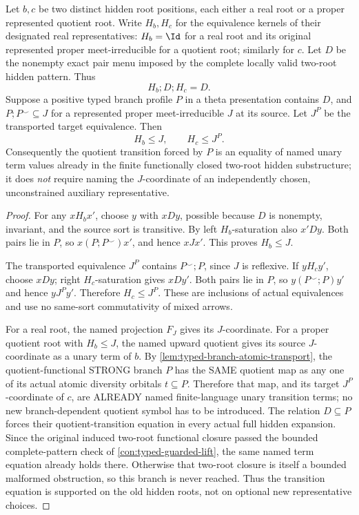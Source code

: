 \begin{lemma}
\label{lem:typed-branch-root-visibility}
Let \(b,c\) be two distinct hidden root positions,
each either a real root or a proper represented quotient
root. Write \(H_b,H_c\) for the equivalence kernels
of their designated real representatives:
\(H_b=\Id\) for a real root and its original
represented proper meet-irreducible for a quotient
root; similarly for \(c\). Let \(D\) be the
nonempty exact pair menu imposed by the
complete locally valid two-root hidden pattern.
Thus
\[
              H_b;D;H_c=D .
\tag{TV1}\label{eq:typed-anchored-bisaturation}
\]
Suppose a positive typed branch profile \(P\)
in a theta presentation contains \(D\), and
\(P;P^\smile\subseteq J\) for a represented
proper meet-irreducible \(J\) at its source.
Let \(J^P\) be the transported target equivalence.
Then
\[
                  H_b\le J,\qquad
                  H_c\le J^P .
\tag{TV2}\label{eq:typed-branch-visible-kernels}
\]
Consequently the quotient transition forced by
\(P\) is an equality of named unary term values
already in the finite functionally closed
two-root hidden substructure; it does
\emph{not} require naming the \(J\)-coordinate
of an independently chosen, unconstrained
auxiliary representative.
\end{lemma}
\begin{proof}
For any \(xH_bx'\), choose \(y\) with
\(xDy\), possible because \(D\) is nonempty,
invariant, and the source sort is transitive.
By left \(H_b\)-saturation also \(x'Dy\).
Both pairs lie in \(P\), so
\(x(P;P^\smile)x'\), and hence \(xJx'\).
This proves \(H_b\le J\).

The transported equivalence \(J^P\)
contains \(P^\smile;P\), since \(J\)
is reflexive. If \(yH_cy'\), choose
\(xDy\); right \(H_c\)-saturation
gives \(xDy'\). Both pairs lie in \(P\),
so \(y(P^\smile;P)y'\) and hence
\(yJ^Py'\). Therefore \(H_c\le J^P\).
These are inclusions of actual equivalences
and use no same-sort commutativity
of mixed arrows.

For a real root, the named projection
\(F_J\) gives its \(J\)-coordinate.
For a proper quotient root with
\(H_b\le J\), the named upward quotient
gives its source \(J\)-coordinate as
a unary term of \(b\). By
\cref{lem:typed-branch-atomic-transport},
the quotient-functional STRONG branch
\(P\) has the SAME quotient map as
any one of its actual atomic
diversity orbitals \(t\subseteq P\).
Therefore that map, and its target
\(J^P\)-coordinate of \(c\), are
ALREADY named finite-language
unary transition terms; no
new branch-dependent quotient
symbol has to be introduced.
The relation \(D\subseteq P\)
forces their quotient-transition equation
in every actual full hidden expansion.
Since the original induced two-root functional
closure passed the bounded complete-pattern
check of \cref{con:typed-guarded-lift},
the same named term equation already holds
there. Otherwise that two-root closure is
itself a bounded malformed obstruction,
so this branch is never reached.
Thus the transition equation is supported
on the old hidden roots, not on optional
new representative choices.
\end{proof}

